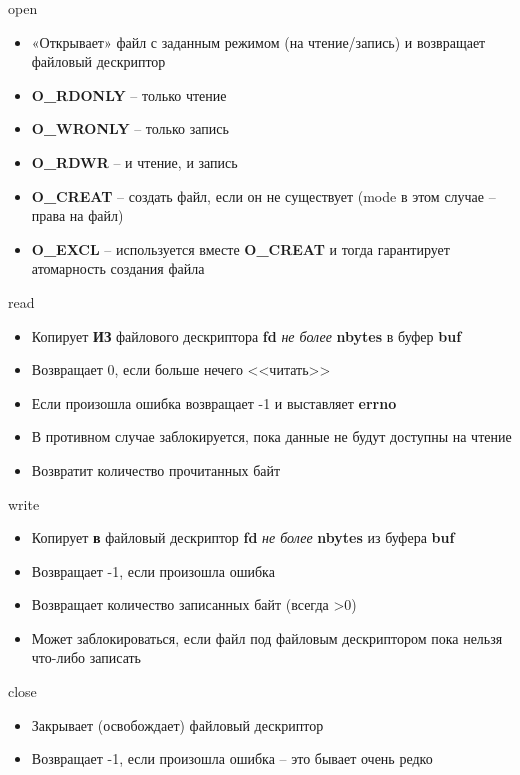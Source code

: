 \documentclass[10pt,pdf,hyperref={unicode}]{beamer}
\begin{document}
\begin{frame}{open}
\begin{itemize}
    \item «Открывает» файл с заданным режимом (на чтение/запись) и возвращает файловый дескриптор
    \item \textbf{O\_RDONLY} -- только чтение
    \item \textbf{O\_WRONLY} -- только запись
    \item \textbf{O\_RDWR} -- и чтение, и запись
    \item \textbf{O\_CREAT} -- создать файл, если он не существует (mode в этом случае -- права на файл)
    \item \textbf{O\_EXCL} -- используется вместе \textbf{O\_CREAT} и тогда гарантирует атомарность создания файла
\end{itemize}
\end{frame}

\begin{frame}{read}
\begin{itemize}
    \item Копирует \textbf{ИЗ} файлового дескриптора \textbf{fd} \emph{не более} \textbf{nbytes} в буфер \textbf{buf}
    \item Возвращает 0, если больше нечего <<читать>>
    \item Если произошла ошибка возвращает -1 и выставляет \textbf{errno}
    \item В противном случае заблокируется, пока данные не будут доступны на чтение
    \item Возвратит количество прочитанных байт
\end{itemize}
\end{frame}

\begin{frame}{write}
\begin{itemize}
    \item Копирует \textbf{в} файловый дескриптор \textbf{fd} \emph{не более} \textbf{nbytes} из буфера \textbf{buf}
    \item Возвращает -1, если произошла ошибка
    \item Возвращает количество записанных байт (всегда >0)
    \item Может заблокироваться, если файл под файловым дескриптором пока нельзя что-либо записать
\end{itemize}
\end{frame}

\begin{frame}{close}
\begin{itemize}
    \item Закрывает (освобождает) файловый дескриптор
    \item Возвращает -1, если произошла ошибка -- это бывает очень редко
\end{itemize}
\end{frame}
\end{document}
